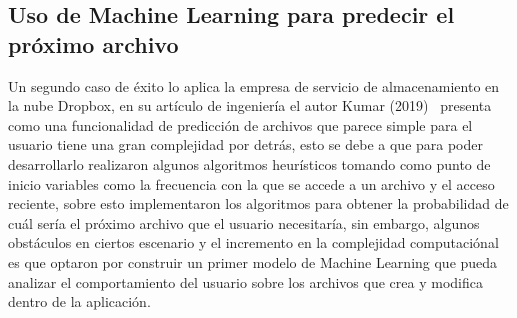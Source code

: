 \documentclass[9pt,a4paper,twoside]{rho-class/rho}
\begin{document}
        \subsection{Uso de Machine Learning para predecir el próximo archivo}
        Un segundo caso de éxito lo aplica la empresa de servicio de almacenamiento en la nube Dropbox, en su artículo de ingeniería el autor Kumar (2019)~\cite{PredictFile} presenta como una funcionalidad de predicción de archivos que parece simple para el usuario tiene una gran complejidad por detrás, esto se debe a que para poder desarrollarlo realizaron algunos algoritmos heurísticos tomando como punto de inicio variables como la frecuencia con la que se accede a un archivo y el acceso reciente, sobre esto implementaron los algoritmos para obtener la probabilidad de cuál sería el próximo archivo que el usuario necesitaría, sin embargo, algunos obstáculos en ciertos escenario y el incremento en la complejidad computaciónal es que optaron por construir un primer modelo de Machine Learning que pueda analizar el comportamiento del usuario sobre los archivos que crea y modifica dentro de la aplicación.

\end{document}
